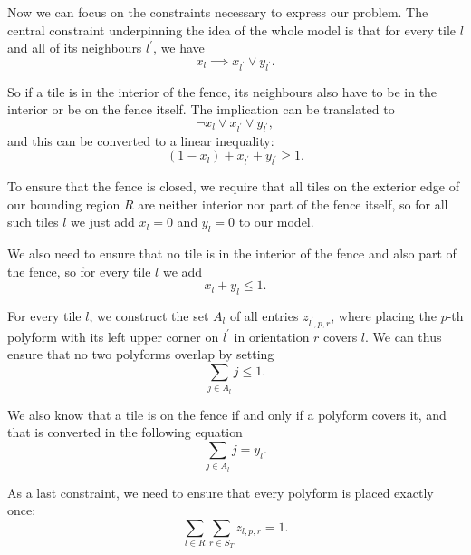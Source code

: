 \documentclass{amsart}
\theoremstyle{definition}
\theoremstyle{remark}
\begin{document}
	Now we can focus on the constraints necessary to express our problem. The central constraint underpinning the idea of the whole model is that for every tile $l$ and all of its neighbours $l^\prime$, we have
	\begin{equation*}
		x_l \implies x_{l^\prime} \lor y_{l^\prime}.
	\end{equation*}
	
	So if a tile is in the interior of the fence, its neighbours also have to be in the interior or be on the fence itself. The implication can be translated to
	\begin{equation*}
		\neg x_l \lor x_{l^\prime} \lor y_{l^\prime},
	\end{equation*}
	and this can be converted to a linear inequality:
	\begin{equation*}
		(1 - x_l) + x_{l^\prime} + y_{l^\prime} \geq 1.
	\end{equation*}
	
	To ensure that the fence is closed, we require that all tiles on the exterior edge of our bounding region $R$ are neither interior nor part of the fence itself, so for all such tiles $l$ we just add $x_l = 0$ and $y_l = 0$ to our model.
	
	We also need to ensure that no tile is in the interior of the fence and also part of the fence, so for every tile $l$ we add
	\begin{equation*}
		x_l + y_l \leq 1.
	\end{equation*}
	
	For every tile $l$, we construct the set $A_l$ of all entries $z_{l^\prime, p, r}$, where placing the $p$-th polyform with its left upper corner on $l^\prime$ in orientation $r$ covers $l$. We can thus ensure that no two polyforms overlap by setting
	\begin{equation*}
		\sum_{j \in A_l} j \leq 1.
	\end{equation*}
	
	We also know that a tile is on the fence if and only if a polyform covers it, and that is converted in the following equation
	\begin{equation*}
		\sum_{j \in A_l} j = y_l.
	\end{equation*}
	
	As a last constraint, we need to ensure that every polyform is placed exactly once:
	\begin{equation*}
		\sum_{l \in R} \sum_{r\in S_T} z_{l, p, r} = 1.
	\end{equation*}
	
\end{document}

